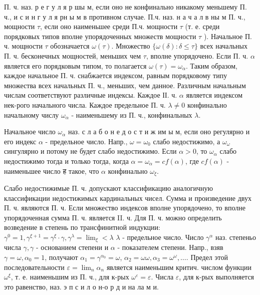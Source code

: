 \documentclass[10pt]{article}
\begin{document}
П. ч. наз. р е г у л я р шы м, если оно не конфинально никакому меньшему П. ч., и с и н г у л я рн ы м в противном случае. П.ч. наз. н а ч а л в ны м П. ч., мощности $\tau$, если оно наименьшее среди П.ч. мощности $\tau$ (т. е. среди порядковых типов вполне упорядоченных множеств мощности $\tau$ ). Начальное П. ч. мощности $\tau$ обозначается $\omega(\tau)$. Множество $\{\omega(\delta): \delta \leqslant \tau\}$ всех начальных П. ч. бесконечных мощностей, меньших чем $\tau$, вполне упорядочено. Если П. ч. $\alpha$ является его порядковым типом, то полагается $\omega(\tau)=\omega_{\alpha}$. Таким образом, каждое начальное П. ч. снабжается индексом, равным порядковому типу множества всех начальных П. ч., меньших, чем данное. Различным начальным числам соответствуют различные индексы. Каждое ІІ. ч. $\alpha$ является индексом нек-рого начального числа. Каждое предельное П. ч. $\lambda \neq 0$ конфинально начальному числу $\omega_{\alpha}$ - наименьшему из П. ч., конфинальных $\lambda$.



Начальное число $\omega_{\alpha}$ наз. с л а б о н е д о с т и ж им ы м, если оно регулярно и его индекс $\alpha$ - предельное число. Напр., $\omega=\omega_{0}$ слабо недостижимо, а $\omega_{\omega}$ сингулярно и потому не будет слабо недостижимо. Если $\alpha>0$, то $\omega_{\alpha}$ слабо недостижимо тогда и только тогда, когда $\alpha=\omega_{\alpha}=c f(\alpha)$, где $c f(\alpha)$ - наименьшее число ह такое, что $\alpha$ конфинально $\omega_{\xi}$.



Слабо недостижимые П. ч. допускают классификацию аналогичную классификации недостижимых кардинальных чисел. Сумма и произведение двух П. ч. являются П. ч. Если множество индексов вполне упорядочено, то вполне упорядоченная сумма П. ч. является II. ч. Для П. ч. можно определить возведение в степень по трансфинитной индукции: $\gamma^{0}=1, \gamma^{\xi+1}=\gamma^{\xi} \cdot \gamma, \gamma^{\lambda}=\lim _{\xi}<\lambda$ $\lambda$ - предельное число. Число $\gamma^{\alpha}$ наз. степеньо числа $\gamma, \gamma$ - основанием степени и $\alpha$ - показателем степени. Напр., взяв $\gamma=\omega, \alpha_{0}=1$, получают $\alpha_{1}=\gamma^{\alpha_{0}}=\omega$, $\alpha_{2}=\omega \omega, \alpha_{3}=\omega^{\omega}, \ldots$. Предел этой последовательности $\varepsilon=\lim _{n} \alpha_{n}$ является наименьшим критич. числом функции $\omega^{\xi}$, т. е. наименьшим из П. ч., для к-рых $\omega^{\varepsilon}=\varepsilon$. Числа $\varepsilon$, для к-рых выполняется это равенство, наз. э п с и л о н-о р д и на ла м и.
\end{document}

